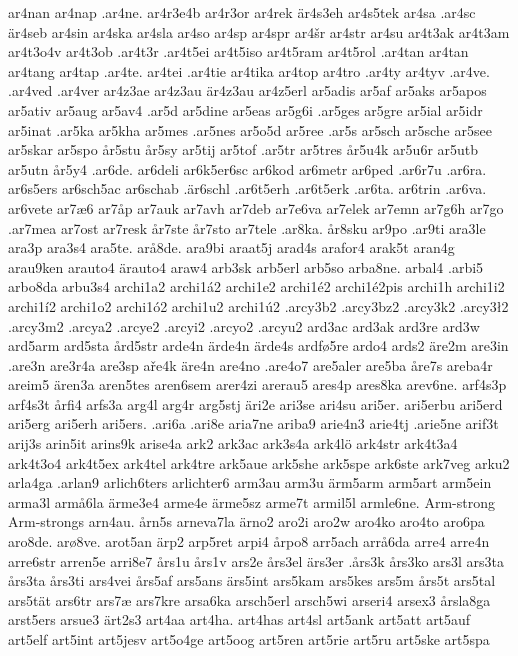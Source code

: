 ar4nan
ar4nap
.ar4ne.
ar4r3e4b
ar4r3or
ar4rek
är4s3eh
ar4s5tek
ar4sa
.ar4sc
är4seb
ar4sin
ar4ska
ar4sla
ar4so
ar4sp
ar4spr
ar4šr
ar4str
ar4su
ar4t3ak
ar4t3am
ar4t3o4v
ar4t3ob
.ar4t3r
.ar4t5ei
ar4t5iso
ar4t5ram
ar4t5rol
.ar4tan
ar4tan
ar4tang
ar4tap
.ar4te.
ar4tei
.ar4tie
ar4tika
ar4top
ar4tro
.ar4ty
ar4tyv
.ar4ve.
.ar4ved
.ar4ver
ar4z3ae
ar4z3au
är4z3au
ar4z5erl
ar5adis
ar5af
ar5aks
ar5apos
ar5ativ
ar5aug
ar5av4
.ar5d
ar5dine
ar5eas
ar5g6i
.ar5ges
ar5gre
ar5ial
ar5idr
ar5inat
.ar5ka
ar5kha
ar5mes
.ar5nes
ar5o5d
ar5ree
.ar5s
ar5sch
ar5sche
ar5see
ar5skar
ar5spo
år5stu
år5sy
ar5tij
ar5tof
.ar5tr
ar5tres
år5u4k
ar5u6r
ar5utb
ar5utn
år5y4
.ar6de.
ar6deli
ar6k5er6sc
ar6kod
ar6metr
ar6ped
.ar6r7u
.ar6ra.
ar6s5ers
ar6sch5ac
ar6schab
.är6schl
.ar6t5erh
.ar6t5erk
.ar6ta.
ar6trin
.ar6va.
ar6vete
ar7æ6
ar7åp
ar7auk
ar7avh
ar7deb
ar7e6va
ar7elek
ar7emn
ar7g6h
ar7go
.ar7mea
ar7ost
ar7resk
år7ste
år7sto
ar7tele
.ar8ka.
år8sku
ar9po
.ar9ti
ara3le
ara3p
ara3s4
ara5te.
arå8de.
ara9bi
araat5j
arad4s
arafor4
arak5t
aran4g
arau9ken
arauto4
ärauto4
araw4
arb3sk
arb5erl
arb5so
arba8ne.
arbal4
.arbi5
arbo8da
arbu3s4
archi1a2
archi1á2
archi1e2
archi1é2
archi1é2pis
archi1h
archi1i2
archi1í2
archi1o2
archi1ó2
archi1u2
archi1ú2
.arcy3b2
.arcy3bz2
.arcy3k2
.arcy3ł2
.arcy3m2
.arcya2
.arcye2
.arcyi2
.arcyo2
.arcyu2
ard3ac
ard3ak
ard3re
ard3w
ard5arm
ard5sta
ård5str
arde4n
ärde4n
ärde4s
ardfø5re
ardo4
ards2
äre2m
are3in
.are3n
are3r4a
are3sp
aře4k
äre4n
are4no
.are4o7
are5aler
are5ba
åre7s
areba4r
areim5
ären3a
aren5tes
aren6sem
arer4zi
arerau5
ares4p
ares8ka
arev6ne.
arf4s3p
arf4s3t
årfi4
arfs3a
arg4l
arg4r
arg5stj
äri2e
ari3se
ari4su
ari5er.
ari5erbu
ari5erd
ari5erg
ari5erh
ari5ers.
.ari6a
.ari8e
aria7ne
ariba9
arie4n3
arie4tj
.arie5ne
arif3t
arij3s
arin5it
arins9k
arise4a
ark2
ark3ac
ark3s4a
ark4lö
ark4str
ark4t3a4
ark4t3o4
ark4t5ex
ark4tel
ark4tre
ark5aue
ark5she
ark5spe
ark6ste
ark7veg
arku2
arla4ga
.arlan9
arlich6ters
arlichter6
arm3au
arm3u
ärm5arm
arm5art
arm5ein
arma3l
armå6la
ärme3e4
arme4e
ärme5sz
arme7t
armil5l
armle6ne.
Arm-strong
Arm-strongs
arn4au.
årn5s
arneva7la
ärno2
aro2i
aro2w
aro4ko
aro4to
aro6pa
aro8de.
arø8ve.
arot5an
ärp2
arp5ret
arpi4
årpo8
arr5ach
arrå6da
arre4
arre4n
arre6str
arren5e
arri8e7
års1u
års1v
ars2e
års3el
ärs3er
.års3k
års3ko
ars3l
ars3ta
års3ta
års3ti
ars4vei
års5af
ars5ans
ärs5int
ars5kam
ars5kes
ars5m
års5t
ars5tal
ars5tät
ars6tr
ars7æ
ars7kre
arsa6ka
arsch5erl
arsch5wi
arseri4
arsex3
årsla8ga
arst5ers
arsue3
ärt2s3
art4aa
art4ha.
art4has
art4sl
art5ank
art5att
art5auf
art5elf
art5int
art5jesv
art5o4ge
art5oog
art5ren
art5rie
art5ru
art5ske
art5spa
